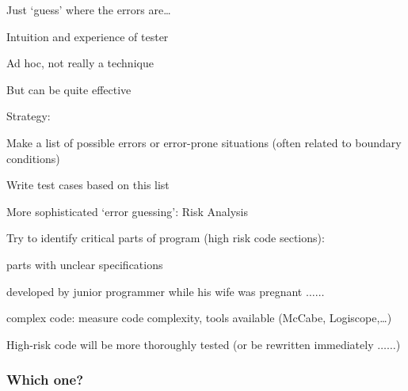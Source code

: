 \begin{itemize*}
	\item Just `guess’ where the errors are\ldots
	\item Intuition and experience of tester
	\item Ad hoc, not really a technique
	\item But can be quite effective
	\item Strategy:
	\begin{itemize*}
		\item Make a list of possible errors or error-prone situations (often related to boundary conditions)
		\item Write test cases based on this list
	\end{itemize*}
	\item More sophisticated `error guessing': Risk Analysis
	\item Try to identify critical parts of program
	(high risk code sections):
	\begin{itemize*}
		\item parts with unclear specifications
		\item developed by junior programmer while his wife was pregnant $\ldots\ldots$
		\item complex code:
		measure code complexity, tools available (McCabe, Logiscope,\ldots)
	\end{itemize*}
	\item High-risk code will be more thoroughly tested (or be rewritten immediately $\ldots\ldots$)
	
\end{itemize*}

\subsubsection{Which one?}

